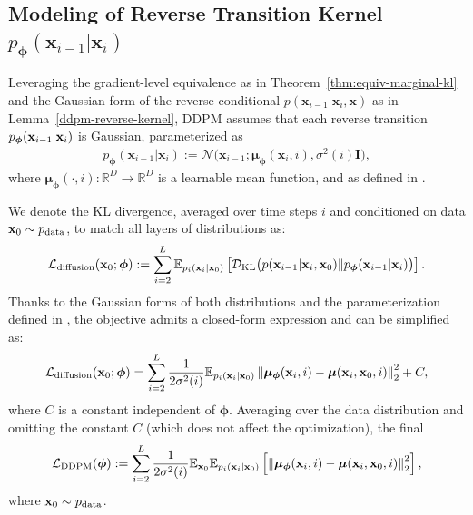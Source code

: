 \subsection{Modeling of Reverse Transition Kernel $p_{\bm{\phi}}(\mathbf{x}_{i-1}|\mathbf{x}_i)$} Leveraging the gradient-level equivalence as in Theorem~\ref{thm:equiv-marginal-kl} and the Gaussian form of the reverse conditional $p(\mathbf{x}_{i-1}|\mathbf{x}_i, \mathbf{x})$ as in Lemma~\ref{ddpm-reverse-kernel}, DDPM assumes that each reverse transition $p_{\bm{\phi}}({\mathbf{x}}_{i-1}| {\mathbf{x}}_i)$ is Gaussian, parameterized as
\begin{align}\label{eq:def-reverse}
    p_{\bm{\phi}}(\mathbf{x}_{i-1}|\mathbf{x}_i) := \mathcal{N}\big(\mathbf{x}_{i-1}; \bm{\mu}_{\bm{\phi}}(\mathbf{x}_i, i), \sigma^2(i) \mathbf{I}\big),
\end{align}
where $\bm{\mu}_{\bm{\phi}}(\cdot, i) \colon \mathbb{R}^D \to \mathbb{R}^D$ is a learnable mean function, and  as defined in .

We denote the KL divergence, averaged over time steps $i$ and conditioned on data ${\mathbf{x}}_0 \sim p_{\text{data}}$, to match all layers of distributions as:
\begin{align}\label{eq:ddpm-diffusion}
    \mathcal{L}_{\text{diffusion}}({\mathbf{x}}_0;\bm{\phi}) := \sum_{i=2}^L \mathbb{E}_{p_i({\mathbf{x}}_i|{\mathbf{x}}_0)}\left[\mathcal{D}_{\text{KL}}\big(p({\mathbf{x}}_{i-1}|{\mathbf{x}}_i, {\mathbf{x}}_0)  \Vert  p_{\bm{\phi}}({\mathbf{x}}_{i-1}|{\mathbf{x}}_i)\big)\right].
\end{align}
Thanks to the Gaussian forms of both distributions and the parameterization defined in , the objective admits a closed-form expression and can be simplified as:
\begin{align}\label{eq:ddpm-diffusion-simp}
    \mathcal{L}_{\text{diffusion}}({\mathbf{x}}_0;\bm{\phi}) = \sum_{i=2}^L \frac{1}{2\sigma^2(i)}  \mathbb{E}_{p_i({\mathbf{x}}_i|{\mathbf{x}}_0)}\left\| \bm{\mu}_{\bm{\phi}}({\mathbf{x}}_i, i) - \bm{\mu}({\mathbf{x}}_i, {\mathbf{x}}_0, i) \right\|_2^2 + C,
\end{align}
where $C$ is a constant independent of $\bm{\phi}$. Averaging over the data distribution and omitting the constant $C$ (which does not affect the optimization), the final 
\begin{align}
\begin{aligned}
    \label{eq:ddpm-mean-loss}
    \mathcal{L}_{\text{DDPM}}(\bm{\phi}) := \sum_{i=2}^L \frac{1}{2\sigma^2(i)}  \mathbb{E}_{{\mathbf{x}}_0} \mathbb{E}_{p_i({\mathbf{x}}_i|{\mathbf{x}}_0)} \left[ \left\| \bm{\mu}_{\bm{\phi}}(\mathbf{x}_i, i) - \bm{\mu}(\mathbf{x}_i, {\mathbf{x}}_0, i) \right\|_2^2 \right],
\end{aligned}
\end{align}
where ${\mathbf{x}}_0\sim p_{\mathrm{data}}$.

